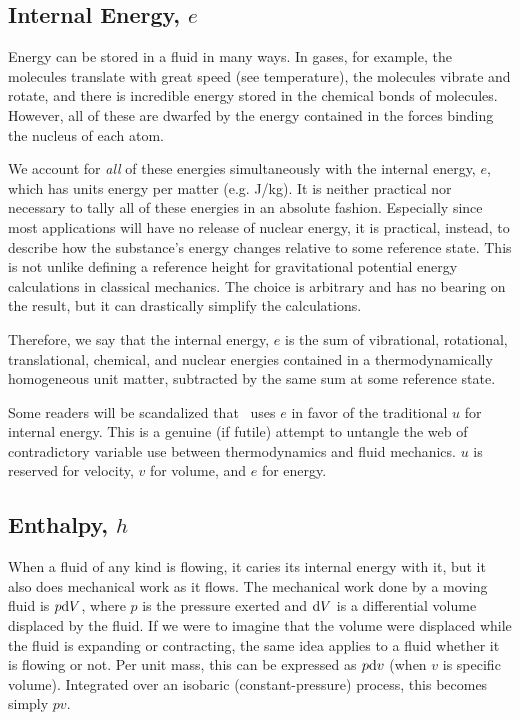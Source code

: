 \subsection{Internal Energy, $e$}\label{sec:intro:e}

Energy can be stored in a fluid in many ways.  In gases, for example, the molecules translate with great speed (see temperature), the molecules vibrate and rotate, and there is incredible energy stored in the chemical bonds of molecules.  However, all of these are dwarfed by the energy contained in the forces binding the nucleus of each atom.

We account for \emph{all} of these energies simultaneously with the internal energy, $e$, which has units energy per matter (e.g. J/kg).  It is neither practical nor necessary to tally all of these energies in an absolute fashion.  Especially since most applications will have no release of nuclear energy, it is practical, instead, to describe how the substance's energy changes relative to some reference state.  This is not unlike defining a reference height for gravitational potential energy calculations in classical mechanics.  The choice is arbitrary and has no bearing on the result, but it can drastically simplify the calculations.

Therefore, we say that the internal energy, $e$ is the sum of vibrational, rotational, translational, chemical, and nuclear energies contained in a thermodynamically homogeneous unit matter, subtracted by the same sum at some reference state.

Some readers will be scandalized that \PM\ uses $e$ in favor of the traditional $u$ for internal energy.  This is a genuine (if futile) attempt to untangle the web of contradictory variable use between thermodynamics and fluid mechanics.  $u$ is reserved for velocity, $v$ for volume, and $e$ for energy.

\subsection{Enthalpy, $h$}\label{sec:intro:h}

When a fluid of any kind is flowing, it caries its internal energy with it, but it also does mechanical work as it flows.  The mechanical work done by a moving fluid is $p \mathrm{d} V$, where $p$ is the pressure exerted and $\mathrm{d} V$ is a differential volume displaced by the fluid.  If we were to imagine that the volume were displaced while the fluid is expanding or contracting, the same idea applies to a fluid whether it is flowing or not.  Per unit mass, this can be expressed as $p \mathrm{d} v$ (when $v$ is specific volume).  Integrated over an isobaric (constant-pressure) process, this becomes simply $p v$.

